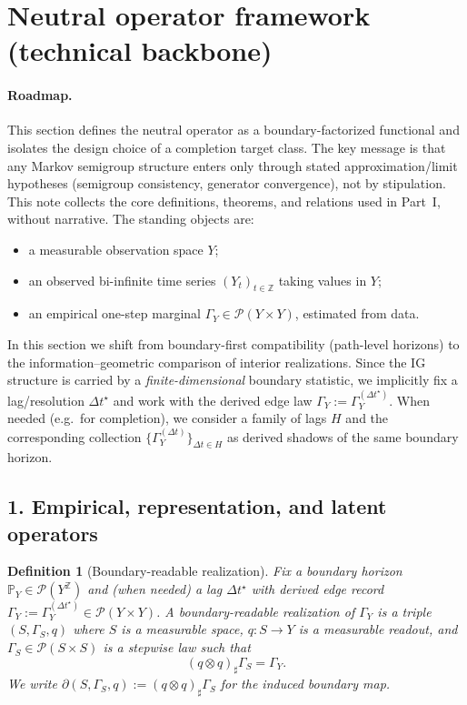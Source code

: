 \documentclass[11pt]{article}
\newtheorem{definition}{Definition}
\newcommand{\Pcal}{\mathcal{P}}
\begin{document}
\section{Neutral operator framework (technical backbone)}


\paragraph{Roadmap.}
This section defines the neutral operator as a boundary-factorized functional and isolates the design choice of a completion target class.
The key message is that any Markov semigroup structure enters only through stated approximation/limit hypotheses (semigroup consistency, generator convergence), not by stipulation.
\medskip
This note collects the core definitions, theorems, and relations used in Part~I,
without narrative. The standing objects are:
\begin{itemize}[leftmargin=1.5em]
  \item a measurable observation space $Y$;
  \item an observed bi-infinite time series $(Y_t)_{t\in\mathbb{Z}}$ taking values in $Y$;
  \item an empirical one-step marginal $\Gamma_Y \in \Pcal(Y\times Y)$, estimated from data.
\end{itemize}

In this section we shift from 
boundary-first compatibility (path-level horizons) to the 
information--geometric comparison of interior realizations.
Since the IG structure is carried by a \emph{finite-dimensional} 
boundary statistic, we implicitly fix a lag/resolution $\Delta t^\star$
and work with the derived edge law $\Gamma_Y:=\Gamma_Y^{(\Delta t^\star)}$.
When needed (e.g.\ for completion), we consider a family of lags $H$
and the corresponding collection $\{\Gamma_Y^{(\Delta t)}\}_{\Delta t\in H}$
as derived shadows of the same boundary horizon.

\subsection*{1. Empirical, representation, and latent operators}

\begin{definition}[Boundary-readable realization]
\label{def:boundary-readable-representation}
Fix a boundary horizon $\mathbb P_Y\in\Pcal(Y^{\mathbb Z})$ and (when needed) a lag $\Delta t^\star$ with derived edge record $\Gamma_Y:=\Gamma_Y^{(\Delta t^\star)}\in\Pcal(Y\times Y)$. A \emph{boundary-readable realization} of $\Gamma_Y$
is a triple $(S,\Gamma_S,q)$ where $S$ is a measurable space, $q:S\to Y$ is a measurable \emph{readout},
and $\Gamma_S\in\Pcal(S\times S)$ is a stepwise law such that
\[
  (q\otimes q)_\sharp\Gamma_S=\Gamma_Y.
\]
We write $\partial(S,\Gamma_S,q):=(q\otimes q)_\sharp\Gamma_S$ for the induced \emph{boundary map}.
\end{definition}
\end{document}
